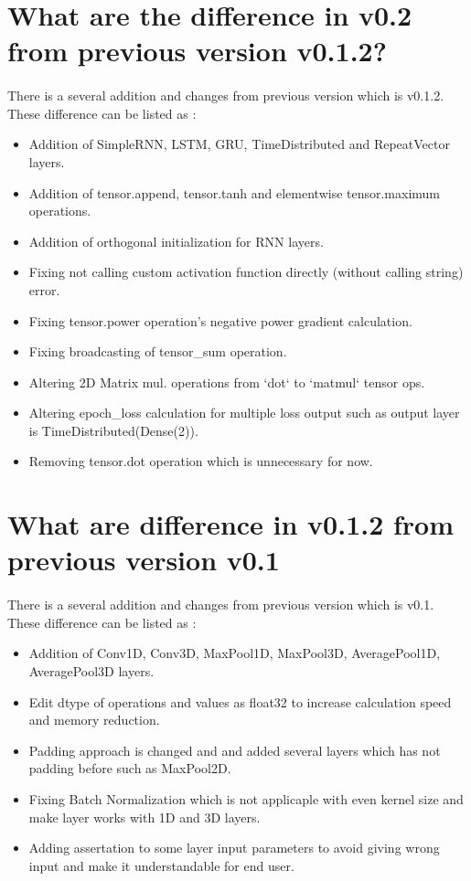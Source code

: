 \documentclass[12pt]{report}
\begin{document}
\section{What are the difference in v0.2 from previous version v0.1.2?}

\paragraph{}
There is a several addition and changes from previous version which is v0.1.2. These difference can be listed as :

\begin{itemize}
	\item Addition of SimpleRNN, LSTM, GRU, TimeDistributed and RepeatVector layers.
	\item Addition of tensor.append, tensor.tanh and elementwise tensor.maximum operations.
	\item Addition of orthogonal initialization for RNN layers.
	\item Fixing not calling custom activation function directly (without calling string) error.
	\item Fixing tensor.power operation's negative power gradient calculation.
	\item Fixing broadcasting of tensor\_sum operation.
	\item Altering 2D Matrix mul. operations from `dot` to `matmul` tensor ops.
	\item Altering epoch\_loss calculation for multiple loss output such as output layer is TimeDistributed(Dense(2)).
	\item Removing tensor.dot operation which is unnecessary for now.
\end{itemize}


\section{What are difference in v0.1.2 from previous version v0.1}
\paragraph{}
There is a several addition and changes from previous version which is v0.1. These difference can be listed as :

\begin{itemize}
	\item Addition of Conv1D, Conv3D, MaxPool1D, MaxPool3D, AveragePool1D, AveragePool3D layers.
	\item Edit dtype of operations and values as float32 to increase calculation speed and memory reduction. 
	\item Padding approach is changed and and added several layers which has not padding before such as MaxPool2D.
	\item Fixing Batch Normalization which is not applicaple with even kernel size and make layer works with 1D and 3D layers. 
	\item Adding assertation to some layer input parameters to avoid giving wrong input and make it understandable for end user.
\end{itemize}
\end{document}
